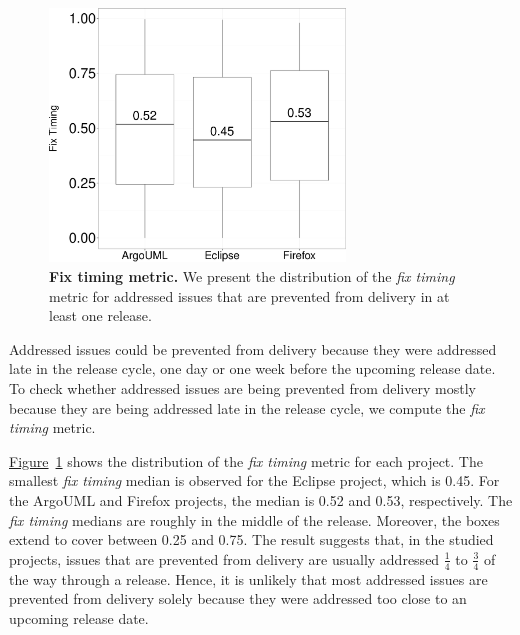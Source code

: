 \begin{figure}[!t]
	\centering
	\includegraphics[width=0.7\textwidth]
	{chapters/chapter4/figures/addressing_stage.pdf}
	\caption{\textbf{Fix timing metric.} We present the
		distribution of the \textit{fix timing} metric for addressed
		issues that are prevented from delivery in at least one release.}
	\label{ch4:fig:boxplotTimeWindow}
\end{figure}

\noindent{} Addressed issues could be prevented
from delivery because they were addressed late in the release cycle, \eg one day
or one week before the upcoming release date. To check whether addressed issues are
being prevented from delivery mostly because they are being addressed late in the
release cycle, we compute the \textit{fix timing} metric. 

\hyperref[ch4:fig:boxplotTimeWindow]{Figure}~\ref{ch4:fig:boxplotTimeWindow} shows the
distribution of the \textit{fix timing} metric for each project. The smallest
\textit{fix timing} median is observed for the Eclipse project, which is 0.45.
For the ArgoUML and Firefox projects, the median is 0.52 and 0.53, respectively.
The \textit{fix timing} medians are roughly in the middle of the release.
Moreover, the boxes extend to cover between 0.25 and 0.75. The result suggests
that, in the studied projects, issues that are prevented from delivery are
usually addressed $\frac{1}{4}$ to $\frac{3}{4}$ of the way through a release.
Hence, it is unlikely that most addressed issues are prevented from delivery
solely because they were addressed too close to an upcoming release date.



